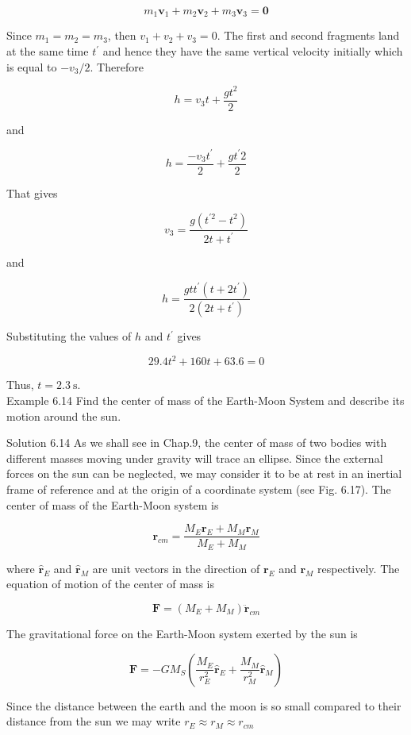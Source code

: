 \documentclass[10pt]{article}
\begin{document}
$$
m_{1} \mathbf{v}_{1}+m_{2} \mathbf{v}_{2}+m_{3} \mathbf{v}_{3}=\mathbf{0}
$$

Since $m_{1}=m_{2}=m_{3}$, then $v_{1}+v_{2}+v_{3}=0$. The first and second fragments land at the same time $t^{\prime}$ and hence they have the same vertical velocity initially which is equal to $-v_{3} / 2$. Therefore

$$
h=v_{3} t+\frac{g t^{2}}{2}
$$

and

$$
h=\frac{-v_{3} t^{\prime}}{2}+\frac{g t^{\prime} 2}{2}
$$

That gives

$$
v_{3}=\frac{g\left(t^{\prime 2}-t^{2}\right)}{2 t+t^{\prime}}
$$

and

$$
h=\frac{g t t^{\prime}\left(t+2 t^{\prime}\right)}{2\left(2 t+t^{\prime}\right)}
$$

Substituting the values of $h$ and $t^{\prime}$ gives

$$
29.4 t^{2}+160 t+63.6=0
$$

Thus, $t=2.3 \mathrm{~s}$.\\
Example 6.14 Find the center of mass of the Earth-Moon System and describe its motion around the sun.

Solution 6.14 As we shall see in Chap.9, the center of mass of two bodies with different masses moving under gravity will trace an ellipse. Since the external forces on the sun can be neglected, we may consider it to be at rest in an inertial frame of reference and at the origin of a coordinate system (see Fig. 6.17). The center of mass of the Earth-Moon system is

$$
\mathbf{r}_{c m}=\frac{M_{E} \mathbf{r}_{E}+M_{M} \mathbf{r}_{M}}{M_{E}+M_{M}}
$$

where $\hat{\mathbf{r}}_{E}$ and $\hat{\mathbf{r}}_{M}$ are unit vectors in the direction of $\mathbf{r}_{E}$ and $\mathbf{r}_{M}$ respectively. The equation of motion of the center of mass is

$$
\mathbf{F}=\left(M_{E}+M_{M}\right) \ddot{\mathbf{r}}_{c m}
$$

The gravitational force on the Earth-Moon system exerted by the sun is

$$
\mathbf{F}=-G M_{S}\left(\frac{M_{E}}{r_{E}^{2}} \hat{\mathbf{r}}_{E}+\frac{M_{M}}{r_{M}^{2}} \hat{\mathbf{r}}_{M}\right)
$$

Since the distance between the earth and the moon is so small compared to their distance from the sun we may write $r_{E} \approx r_{M} \approx r_{c m}$
\end{document}
